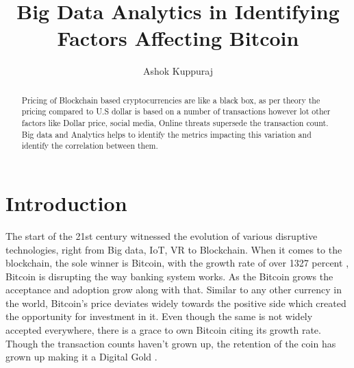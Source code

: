 \documentclass[sigconf]{acmart}
\begin{document}
\title{Big Data Analytics in Identifying Factors Affecting Bitcoin}


\author{Ashok Kuppuraj}


\renewcommand{\shortauthors}{G. v. Laszewski}


\begin{abstract}
Pricing of Blockchain based cryptocurrencies are like a black box, as per theory the pricing compared to U.S dollar is based on a number of transactions however lot other factors like Dollar price, social media, Online threats supersede the transaction count. Big data and Analytics helps to identify the metrics impacting this variation and identify the correlation between them.
\end{abstract}



\maketitle

\section{Introduction}
The start of the 21st century witnessed the evolution of various disruptive technologies, right from Big data, IoT, VR to Blockchain. When it comes to the blockchain, the sole winner is Bitcoin, with the growth rate of over 1327 percent \cite{coingrowth:online}, Bitcoin is disrupting the way banking system works. As the Bitcoin grows the acceptance and adoption grow along with that. Similar to any other currency in the world, Bitcoin's price deviates widely towards the positive side which created the opportunity for investment in it. Even though the same is not widely accepted everywhere, there is a grace to own Bitcoin citing its growth rate. Though the transaction counts haven't grown up, the retention of the coin has grown up making it a Digital Gold \cite{Retain:online}.
\end{document}
